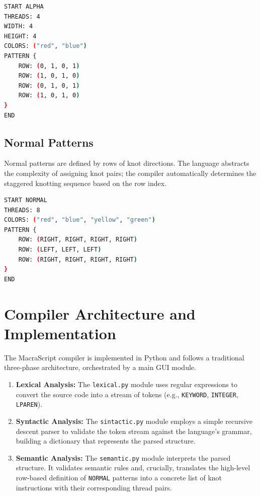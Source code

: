 \documentclass[conference]{IEEEtran}
\begin{document}
\begin{lstlisting}[language=bash, caption={Example of an Alpha Pattern}]
START ALPHA
THREADS: 4
WIDTH: 4
HEIGHT: 4
COLORS: ("red", "blue")
PATTERN {
    ROW: (0, 1, 0, 1)
    ROW: (1, 0, 1, 0)
    ROW: (0, 1, 0, 1)
    ROW: (1, 0, 1, 0)
}
END
\end{lstlisting}

\subsection{Normal Patterns}
Normal patterns are defined by rows of knot directions. The language abstracts the complexity of assigning knot pairs; the compiler automatically determines the staggered knotting sequence based on the row index.

\begin{lstlisting}[language=bash, caption={Example of a Normal Pattern}]
START NORMAL
THREADS: 8
COLORS: ("red", "blue", "yellow", "green")
PATTERN {
    ROW: (RIGHT, RIGHT, RIGHT, RIGHT)
    ROW: (LEFT, LEFT, LEFT)
    ROW: (RIGHT, RIGHT, RIGHT, RIGHT)
}
END
\end{lstlisting}

\section{Compiler Architecture and Implementation}
The MacraScript compiler is implemented in Python and follows a traditional three-phase architecture, orchestrated by a main GUI module.

\begin{enumerate}
    \item \textbf{Lexical Analysis:} The \texttt{lexical.py} module uses regular expressions to convert the source code into a stream of tokens (e.g., \texttt{KEYWORD}, \texttt{INTEGER}, \texttt{LPAREN}).
    \item \textbf{Syntactic Analysis:} The \texttt{sintactic.py} module employs a simple recursive descent parser to validate the token stream against the language's grammar, building a dictionary that represents the parsed structure.
    \item \textbf{Semantic Analysis:} The \texttt{semantic.py} module interprets the parsed structure. It validates semantic rules and, crucially, translates the high-level row-based definition of \texttt{NORMAL} patterns into a concrete list of knot instructions with their corresponding thread pairs.
\end{enumerate}
\end{document}
